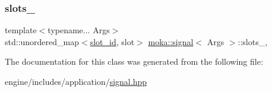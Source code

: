 \mbox{\label{classmoka_1_1signal_a786a40361180f9f294b57be412ddaaa9}} 
\subsubsection{\texorpdfstring{slots\_}{slots\_}}
{\footnotesize\ttfamily template$<$typename... Args$>$ \\
std\+::unordered\+\_\+map$<$\mbox{\hyperlink{namespacemoka_a959d3112313fb589684e8b1e3df66385}{slot\+\_\+id}}, slot$>$ \mbox{\hyperlink{classmoka_1_1signal}{moka\+::signal}}$<$ Args $>$\+::slots\+\_\+\hspace{0.3cm}{\ttfamily [mutable]}, {\ttfamily [protected]}}



The documentation for this class was generated from the following file\+:\begin{DoxyCompactItemize}
\item 
engine/includes/application/\mbox{\hyperlink{signal_8hpp}{signal.\+hpp}}\end{DoxyCompactItemize}
